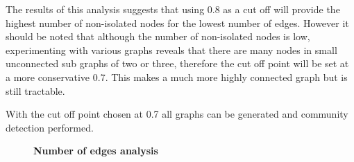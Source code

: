 The results of this analysis suggests that using 0.8 as a cut off will provide the highest number of non-isolated nodes for the lowest number of edges. However it should be noted that although the number of non-isolated nodes is low, experimenting with various graphs reveals that there are many nodes in small unconnected sub graphs of two or three, therefore the cut off point will be set at a more conservative 0.7. This makes a much more highly connected graph but is still tractable. 

With the cut off point chosen at 0.7 all graphs can be generated and community detection performed.

\begin{figure}[ht]
\centering
\textbf{Number of edges analysis}\par\medskip
{}


\end{figure}
